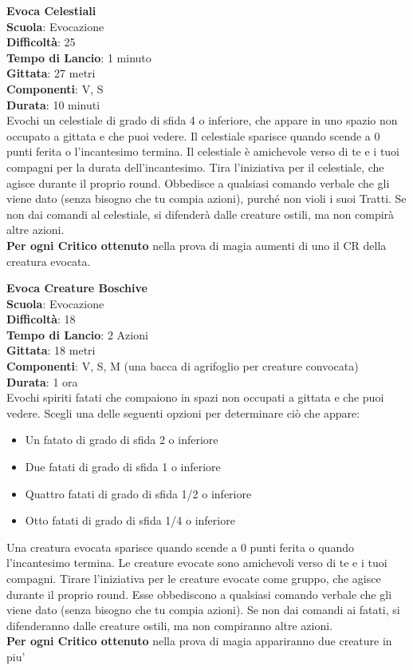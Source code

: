 \begin{multicols}{2}
\medskip\textbf{Evoca Celestiali}\\
\textbf{Scuola}: Evocazione\\
\textbf{Difficoltà}:  25\\
\textbf{Tempo di Lancio}: 1 minuto\\
\textbf{Gittata}: 27 metri\\
\textbf{Componenti}: V, S\\
\textbf{Durata}: 10 minuti\\
Evochi un celestiale di grado di sfida 4 o inferiore, che appare in uno spazio non occupato a gittata e che puoi vedere. Il celestiale sparisce quando scende a 0 punti ferita o l'incantesimo termina. Il celestiale è amichevole verso di te e i tuoi compagni per la durata dell'incantesimo. Tira l’iniziativa per il celestiale, che agisce durante il proprio round. Obbedisce a qualsiasi comando verbale che gli viene dato (senza bisogno che tu compia azioni), purché non violi i suoi Tratti. Se non dai comandi al celestiale, si difenderà dalle creature ostili, ma non compirà altre azioni.\\
\textbf{Per ogni Critico ottenuto} nella prova di magia aumenti di uno il CR della creatura evocata.

\medskip\textbf{Evoca Creature Boschive}\\
\textbf{Scuola}: Evocazione\\
\textbf{Difficoltà}:  18\\
\textbf{Tempo di Lancio}: 2 Azioni\\
\textbf{Gittata}: 18 metri\\
\textbf{Componenti}: V, S, M (una bacca di agrifoglio per creature convocata)\\
\textbf{Durata}: 1 ora \\
Evochi spiriti fatati che compaiono in spazi non occupati a gittata e che puoi vedere. Scegli una delle seguenti opzioni per determinare ciò che appare:
\begin{itemize}
\item Un fatato di grado di sfida 2 o inferiore
\item Due fatati di grado di sfida 1 o inferiore
\item Quattro fatati di grado di sfida 1/2 o inferiore
\item Otto fatati di grado di sfida 1/4 o inferiore
\end{itemize}
\medskip
Una creatura evocata sparisce quando scende a 0 punti ferita o quando l'incantesimo termina. Le creature evocate sono amichevoli verso di te e i tuoi compagni. Tirare l’iniziativa per le creature evocate come gruppo, che agisce durante il proprio round. Esse obbediscono a qualsiasi comando verbale che gli viene dato (senza bisogno che tu compia azioni). Se non dai comandi ai fatati, si difenderanno dalle creature ostili, ma non compiranno altre azioni.\\
\textbf{Per ogni Critico ottenuto} nella prova di magia appariranno due creature in piu'


\end{multicols}
